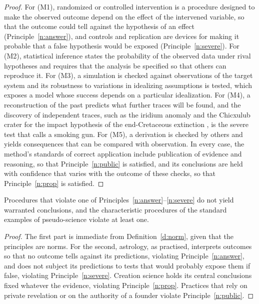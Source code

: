 \documentclass{situationist-preprint}
\begin{document}
\begin{proof}
For (M1), randomized or controlled intervention is a procedure designed to make the observed outcome depend on the effect of the intervened variable, so that the outcome could tell against the hypothesis of an effect (Principle~\ref{n:answer}), and controls and replication are devices for making it probable that a false hypothesis would be exposed (Principle~\ref{n:severe}). For (M2), statistical inference states the probability of the observed data under rival hypotheses and requires that the analysis be specified so that others can reproduce it. For (M3), a simulation is checked against observations of the target system and its robustness to variations in idealizing assumptions is tested, which exposes a model whose success depends on a particular idealization. For (M4), a reconstruction of the past predicts what further traces will be found, and the discovery of independent traces, such as the iridium anomaly and the Chicxulub crater for the impact hypothesis of the end-Cretaceous extinction \citep{Alvarez1980}, is the severe test that \citet{Cleland2002} calls a smoking gun. For (M5), a derivation is checked by others and yields consequences that can be compared with observation. In every case, the method's standards of correct application include publication of evidence and reasoning, so that Principle~\ref{n:public} is satisfied, and its conclusions are held with confidence that varies with the outcome of these checks, so that Principle~\ref{n:prop} is satisfied.
\end{proof}

\begin{proposition}\label{p:exclude}
Procedures that violate one of Principles~\ref{n:answer}--\ref{n:severe} do not yield warranted conclusions, and the characteristic procedures of the standard examples of pseudo-science violate at least one.
\end{proposition}

\begin{proof}
The first part is immediate from Definition~\ref{d:norm}, given that the principles are norms. For the second, astrology, as practised, interprets outcomes so that no outcome tells against its predictions, violating Principle~\ref{n:answer}, and does not subject its predictions to tests that would probably expose them if false, violating Principle~\ref{n:severe}. Creation science holds its central conclusions fixed whatever the evidence, violating Principle~\ref{n:prop}. Practices that rely on private revelation or on the authority of a founder violate Principle~\ref{n:public}.
\end{proof}
\end{document}
